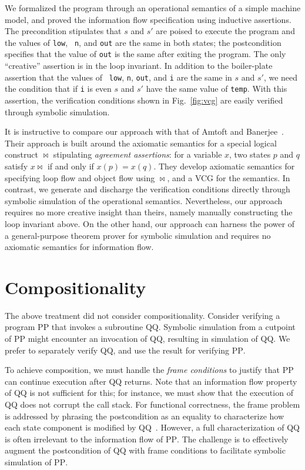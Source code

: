 \documentclass[conference]{IEEEtran}
\newcommand{\proc}[1]{\ifmmode\mbox{\textsc{#1}}\else\textsc{#1}\fi}
\begin{document}
We formalized the program through an operational semantics of a simple
machine model, and proved the information flow specification using
inductive assertions.  The precondition stipulates that $s$ and $s'$
are poised to execute the program and the values of {\tt low}, {\tt
n}, and {\tt out} are the same in both states; the postcondition
specifies that the value of {\tt out} is the same after exiting the
program.  The only ``creative'' assertion is in the loop invariant.
In addition to the boiler-plate assertion that the values of {\tt
low}, {\tt n}, {\tt out}, and {\tt i} are the same in $s$ and $s'$, we
need the condition that if {\tt i} is even $s$ and $s'$ have the same
value of {\tt temp}.  With this assertion, the verification conditions
shown in Fig.~\ref{fig:vcg} are easily verified through symbolic
simulation.

It is instructive to compare our approach with that of Amtoft and
Banerjee~\cite{tricky}.  Their approach is built around the axiomatic
semantics for a special logical construct $\Join$ stipulating {\em
agreement assertions}: for a variable $x$, two states $p$ and $q$
satisfy $x\Join$ if and only if $x(p)=x(q)$.  They develop axiomatic
semantics for specifying loop flow and object flow using $\Join$, and
a VCG for the semantics.  In contrast, we generate and discharge the
verification conditions directly through symbolic simulation of the
operational semantics.  Nevertheless, our approach requires no more
creative insight than theirs, namely manually constructing the loop
invariant above.  On the other hand, our approach can harness the
power of a general-purpose theorem prover for symbolic simulation and
requires no axiomatic semantics for information flow.


\section{Compositionality}
\label{sec:compositionality}

The above treatment did not consider compositionality.  Consider
verifying a program \proc{P} that invokes a subroutine
\proc{Q}. Symbolic simulation from a cutpoint of \proc{P} might
encounter an invocation of \proc{Q}, resulting in simulation of
\proc{Q}.  We prefer to separately verify \proc{Q}, and use the
result for verifying \proc{P}.

To achieve composition, we must handle the {\em frame conditions} to
justify that \proc{P} can continue execution after \proc{Q} returns.
Note that an information flow property of \proc{Q} is not sufficient
for this; for instance, we must show that the execution of \proc{Q}
does not corrupt the call stack.  For functional correctness, the
frame problem is addressed by phrasing the postcondition as an
equality to characterize how each state component is modified by
\proc{Q}~\cite{symbolic}.  However, a full characterization of
\proc{Q} is often irrelevant to the information flow of \proc{P}.  The
challenge is to effectively augment the postcondition of \proc{Q} with
frame conditions to facilitate symbolic simulation of \proc{P}.
\end{document}
